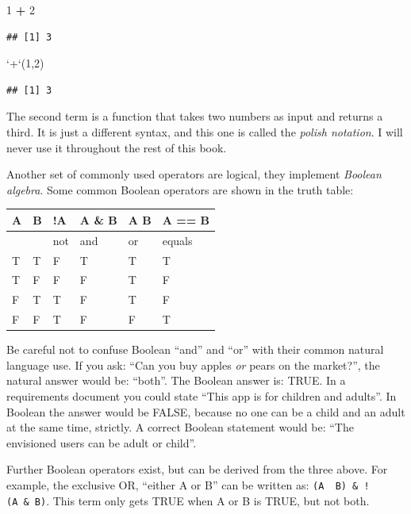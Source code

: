 \documentclass[]{svmono}
\newenvironment{Shaded}{\begin{snugshade}}{\end{snugshade}}
\newcommand{\DataTypeTok}[1]{\textcolor[rgb]{0.13,0.29,0.53}{#1}}
\newcommand{\DecValTok}[1]{\textcolor[rgb]{0.00,0.00,0.81}{#1}}
\newcommand{\StringTok}[1]{\textcolor[rgb]{0.31,0.60,0.02}{#1}}
\newcommand{\OperatorTok}[1]{\textcolor[rgb]{0.81,0.36,0.00}{\textbf{#1}}}
\newcommand{\NormalTok}[1]{#1}
\theoremstyle{definition}
\theoremstyle{definition}
\theoremstyle{definition}
\theoremstyle{remark}
\begin{document}
\begin{Shaded}
\begin{Highlighting}[]
\DecValTok{1} \OperatorTok{+}\StringTok{ }\DecValTok{2}
\end{Highlighting}
\end{Shaded}

\begin{verbatim}
## [1] 3
\end{verbatim}

\begin{Shaded}
\begin{Highlighting}[]
\StringTok{`}\DataTypeTok{+}\StringTok{`}\NormalTok{(}\DecValTok{1}\NormalTok{,}\DecValTok{2}\NormalTok{)}
\end{Highlighting}
\end{Shaded}

\begin{verbatim}
## [1] 3
\end{verbatim}

The second term is a function that takes two numbers as input and
returns a third. It is just a different syntax, and this one is called
the \emph{polish notation}. I will never use it throughout the rest of
this book.

Another set of commonly used operators are logical, they implement
\emph{Boolean algebra}. Some common Boolean operators are shown in the
truth table:

\begin{longtable}[]{@{}llllll@{}}
\toprule
A & B & !A & A \& B & A \textbar{} B & A == B\tabularnewline
\midrule
\endhead
& & not & and & or & equals\tabularnewline
T & T & F & T & T & T\tabularnewline
T & F & F & F & T & F\tabularnewline
F & T & T & F & T & F\tabularnewline
F & F & T & F & F & T\tabularnewline
\bottomrule
\end{longtable}

Be careful not to confuse Boolean ``and'' and ``or'' with their common
natural language use. If you ask: ``Can you buy apples \emph{or} pears
on the market?'', the natural answer would be: ``both''. The Boolean
answer is: TRUE. In a requirements document you could state ``This app
is for children and adults''. In Boolean the answer would be FALSE,
because no one can be a child and an adult at the same time, strictly. A
correct Boolean statement would be: ``The envisioned users can be adult
or child''.

Further Boolean operators exist, but can be derived from the three
above. For example, the exclusive OR, ``either A or B'' can be written
as: \texttt{(A\ \textbar{}\ B)\ \&\ !(A\ \&\ B)}. This term only gets
TRUE when A or B is TRUE, but not both.
\end{document}
